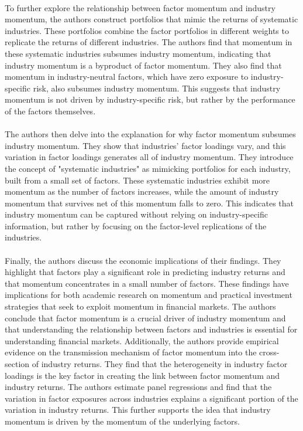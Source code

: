 \documentclass{article}
\begin{document}
\\
To further explore the relationship between factor momentum and industry momentum, the authors construct portfolios that mimic the returns of systematic industries. These portfolios combine the factor portfolios in different weights to replicate the returns of different industries. The authors find that momentum in these systematic industries subsumes industry momentum, indicating that industry momentum is a byproduct of factor momentum. They also find that momentum in industry-neutral factors, which have zero exposure to industry-specific risk, also subsumes industry momentum. This suggests that industry momentum is not driven by industry-specific risk, but rather by the performance of the factors themselves. \\
\\
The authors then delve into the explanation for why factor momentum subsumes industry momentum. They show that industries' factor loadings vary, and this variation in factor loadings generates all of industry momentum. They introduce the concept of "systematic industries" as mimicking portfolios for each industry, built from a small set of factors. These systematic industries exhibit more momentum as the number of factors increases, while the amount of industry momentum that survives net of this momentum falls to zero. This indicates that industry momentum can be captured without relying on industry-specific information, but rather by focusing on the factor-level replications of the industries. \\
\\
Finally, the authors discuss the economic implications of their findings. They highlight that factors play a significant role in predicting industry returns and that momentum concentrates in a small number of factors. These findings have implications for both academic research on momentum and practical investment strategies that seek to exploit momentum in financial markets. The authors conclude that factor momentum is a crucial driver of industry momentum and that understanding the relationship between factors and industries is essential for understanding financial markets. Additionally, the authors provide empirical evidence on the transmission mechanism of factor momentum into the cross-section of industry returns. They find that the heterogeneity in industry factor loadings is the key factor in creating the link between factor momentum and industry returns. The authors estimate panel regressions and find that the variation in factor exposures across industries explains a significant portion of the variation in industry returns. This further supports the idea that industry momentum is driven by the momentum of the underlying factors. 
\end{document}
